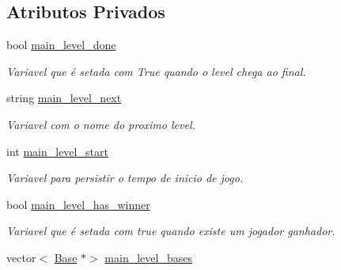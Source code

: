 \subsection*{Atributos Privados}
\begin{DoxyCompactItemize}
\item 
\mbox{\label{classMainLevel_ac73ac0af37dc694036a7da248d70ba75}} 
bool \mbox{\hyperlink{classMainLevel_ac73ac0af37dc694036a7da248d70ba75}{main\+\_\+level\+\_\+done}}
\begin{DoxyCompactList}\small\item\em Variavel que é setada com True quando o level chega ao final. \end{DoxyCompactList}\item 
\mbox{\label{classMainLevel_a59fd5d005f67e7bc45f470531b68614b}} 
string \mbox{\hyperlink{classMainLevel_a59fd5d005f67e7bc45f470531b68614b}{main\+\_\+level\+\_\+next}}
\begin{DoxyCompactList}\small\item\em Variavel com o nome do proximo level. \end{DoxyCompactList}\item 
\mbox{\label{classMainLevel_aadcc3ea08aae9bab68c5cd4a5583e8ea}} 
int \mbox{\hyperlink{classMainLevel_aadcc3ea08aae9bab68c5cd4a5583e8ea}{main\+\_\+level\+\_\+start}}
\begin{DoxyCompactList}\small\item\em Variavel para persistir o tempo de inicio de jogo. \end{DoxyCompactList}\item 
\mbox{\label{classMainLevel_a6322c1a74e91e0b54dfa8368602963ad}} 
bool \mbox{\hyperlink{classMainLevel_a6322c1a74e91e0b54dfa8368602963ad}{main\+\_\+level\+\_\+has\+\_\+winner}}
\begin{DoxyCompactList}\small\item\em Variavel que é setada com true quando existe um jogador ganhador. \end{DoxyCompactList}\item 
\mbox{\label{classMainLevel_a12e4db8964ee51a21bf0b3f3c04dafef}} 
vector$<$ \mbox{\hyperlink{classBase}{Base}} $\ast$$>$ \mbox{\hyperlink{classMainLevel_a12e4db8964ee51a21bf0b3f3c04dafef}{main\+\_\+level\+\_\+bases}}
$$
\end{DoxyCompactItemize}
